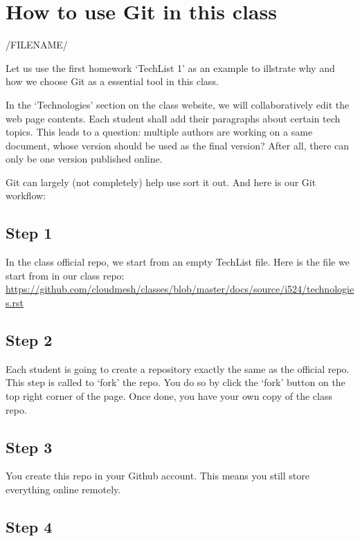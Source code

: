 \section{How to use Git in this class}\label{how-to-use-git-in-this-class}

/FILENAME/

Let us use the first homework `TechList 1' as an example to illstrate
why and how we choose Git as a essential tool in this class.

In the `Technologies' section on the class website, we will
collaboratively edit the web page contents. Each student shall add their
paragraphs about certain tech topics. This leads to a question: multiple
authors are working on a same document, whose version should be used as
the final version? After all, there can only be one version published
online.

Git can largely (not completely) help use sort it out. And here is our
Git workflow:

\subsection{Step 1}\label{step-1}

In the class official repo, we start from an empty TechList file. Here
is the file we start from in our class repo:
\url{https://github.com/cloudmesh/classes/blob/master/docs/source/i524/technologies.rst}

\subsection{Step 2}\label{step-2}

Each student is going to create a repository exactly the same as the
official repo. This step is called to `fork' the repo. You do so by
click the `fork' button on the top right corner of the page. Once done,
you have your own copy of the class repo.

\subsection{Step 3}\label{step-3}

You create this repo in your Github account. This means you still store
everything online remotely.

\subsection{Step 4}\label{step-4}

